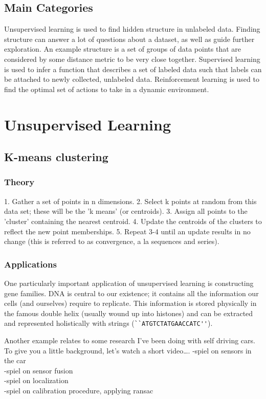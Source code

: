 \documentclass[11pt]{article}
\begin{document}
\subsection{Main Categories}
Unsupervised learning is used to find hidden structure in unlabeled data.
Finding structure can answer a lot of questions about a dataset, as well as guide further exploration. An example structure is a set of groups of data points that are considered by some distance metric to be very close together.
Supervised learning is used to infer a function that describes a set of labeled data such that labels can be attached to newly collected, unlabeled data.
Reinforcement learning is used to find the optimal set of actions to take in a dynamic environment.

\section{Unsupervised Learning}
\subsection{K-means clustering}
\subsubsection{Theory}
1. Gather a set of points in n dimensions.
2. Select k points at random from this data set; these will be the 'k means' (or centroids).
3. Assign all points to the 'cluster' containing the nearest centroid.
4. Update the centroids of the clusters to reflect the new point memberships.
5. Repeat 3-4 until an update results in no change (this is referred to as convergence, a la sequences and series).
\subsubsection{Applications}
One particularly important application of unsupervised learning is constructing gene families. DNA is central to our existence; it contains all the information our cells (and ourselves) require to replicate. This information is stored physically in the famous double helix (usually wound up into histones) and can be extracted and represented holistically with strings (\verb|``ATGTCTATGAACCATC''|).

Another example relates to some research I've been doing with self driving cars. To give you a little background, let's watch a short video\ldots. 
-spiel on sensors in the car \\
-spiel on sensor fusion \\
-spiel on localization \\
-spiel on calibration procedure, applying ransac \\
\end{document}
